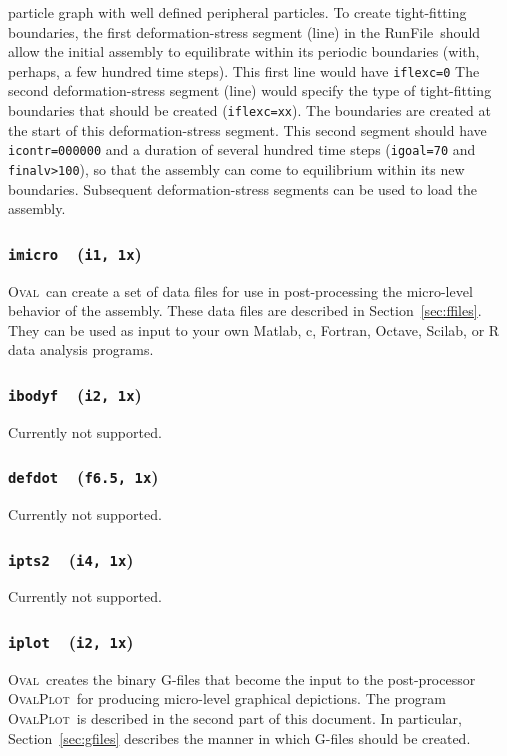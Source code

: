 \documentclass[letterpaper,11pt]{article}
\newcommand{\Oval}{\textsc{Oval}}
\newcommand{\OvalPlot}{\textsc{OvalPlot}}
\newcommand{\Var}[2]{\texttt{#1}\ \  (\texttt{#2})}
\newcommand{\RunFile}{\textsf{RunFile}}
\begin{document}
particle graph with well defined peripheral particles.
To create tight-fitting boundaries, the first deformation-stress segment
(line) in the \RunFile\ should allow the initial assembly to equilibrate
within its periodic boundaries (with, perhaps, a few hundred time steps).
This first line would have \texttt{iflexc=0}
The second deformation-stress segment (line) would specify the type of
tight-fitting boundaries that should be created
(\texttt{iflexc=xx}).  The boundaries are created at the start of this
deformation-stress segment.  This second segment should have 
\texttt{icontr=000000} and a duration 
of several hundred time steps (\texttt{igoal=70} and \texttt{finalv>100}), 
so that the assembly can come to equilibrium
within its new boundaries.
Subsequent deformation-stress segments can be used to load the assembly.
%
\subsubsection[\texttt{imicro}]{\Var{imicro}{i1, 1x}}\label{sec:imicro}
\Oval\ can create a set of data files 
for use in post-processing the micro-level behavior of the assembly.
These data files are described in Section~\ref{sec:ffiles}. 
They can be used as input to your own Matlab, c, Fortran, Octave, Scilab, or R
data analysis programs.
%
\subsubsection[\texttt{ibodyf}]{\Var{ibodyf}{i2, 1x}}
Currently not supported.
%
\subsubsection[\texttt{defdot}]{\Var{defdot}{f6.5, 1x}}
Currently not supported.
%
\subsubsection[\texttt{ipts2}]{\Var{ipts2}{i4, 1x}}
Currently not supported.
%
\subsubsection[\texttt{iplot}]{\Var{iplot}{i2, 1x}}\label{sec:iplot}
\Oval\ creates the binary G-files that 
become the input to the post-processor 
\OvalPlot\ for producing micro-level graphical depictions.
The program \OvalPlot\ is described in the second part of this document.
In particular, Section~\ref{sec:gfiles} describes the manner in which 
G-files should be created.
%
\end{document}
